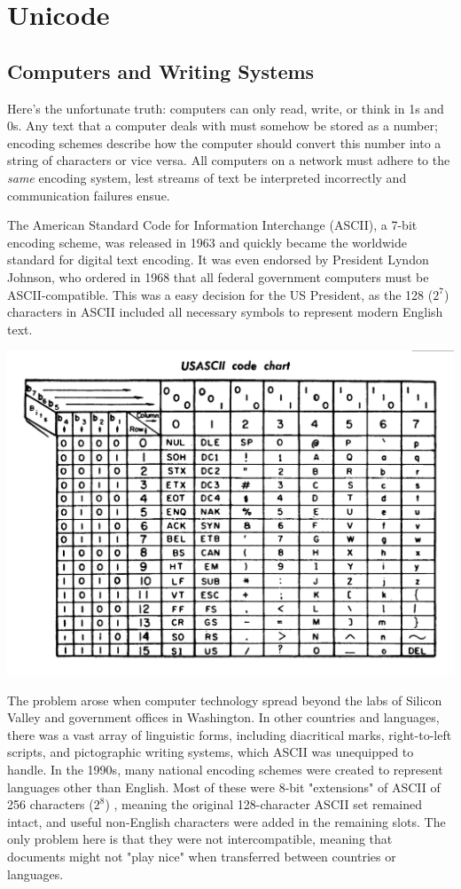 \section{Unicode}

\subsection{Computers and Writing Systems}

Here's the unfortunate truth: computers can only read, write, or think in 1s and
0s. Any text that a computer deals with must somehow be stored as a number;
encoding schemes describe how the computer should convert this number into a
string of characters or vice versa. All computers on a network must adhere to
the \textit{same} encoding system, lest streams of text be interpreted
incorrectly and communication failures ensue.

The American Standard Code for Information Interchange (ASCII), a 7-bit encoding
scheme, was released in 1963 and quickly became the worldwide standard for
digital text encoding. It was even endorsed by President Lyndon Johnson, who
ordered in 1968 that all federal government computers must be ASCII-compatible.
This was a easy decision for the US President, as the 128 ($2^7$) characters in ASCII
included all necessary symbols to represent modern English text.

\includegraphics{subtex/ascii-chart.png}

The problem arose when computer technology spread beyond the labs of Silicon
Valley and government offices in Washington. In other countries and languages,
there was a vast array of linguistic forms, including diacritical marks,
right-to-left scripts, and pictographic writing systems, which ASCII was
unequipped to handle. In the 1990s, many national encoding schemes were created
to represent languages other than English. Most of these were 8-bit "extensions"
of ASCII of 256 characters ($2^8$) , meaning the original 128-character ASCII
set remained intact, and useful non-English characters were added in the
remaining slots. The only problem here is that they were not intercompatible,
meaning that documents might not "play nice" when transferred between countries
or languages.

